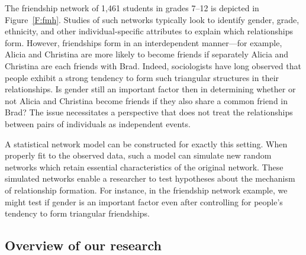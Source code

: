 \documentclass[12pt]{article}
\begin{document}
The friendship network of 1,461 students in grades 7--12 is depicted
in Figure~\ref{F:fmh}.  Studies of such networks typically look to 
identify gender, grade, ethnicity, and 
other individual-specific attributes to explain which relationships form.
However, friendships form in an interdependent manner---for example, Alicia 
and Christina are more likely to become friends if separately Alicia and Christina 
are each friends with Brad. Indeed, sociologists have long observed that people 
exhibit a strong tendency to form such triangular structures in their relationships.
Is gender still an important factor then in determining whether or not 
Alicia and Christina become friends if they also share a common friend in Brad? 
The issue necessitates a perspective 
that does not treat the relationships between pairs of individuals as independent events.


A statistical network model can be constructed for exactly this setting.
When properly fit to the observed data, such a model can 
simulate new random networks which retain essential characteristics of 
the original network.  These simulated networks enable a researcher to 
 test hypotheses about the mechanism of relationship formation.
For instance, in the friendship network example, we might test if
gender is an important factor even after controlling for people's tendency to 
form triangular friendships.

\subsection{Overview of our research}
\end{document}

